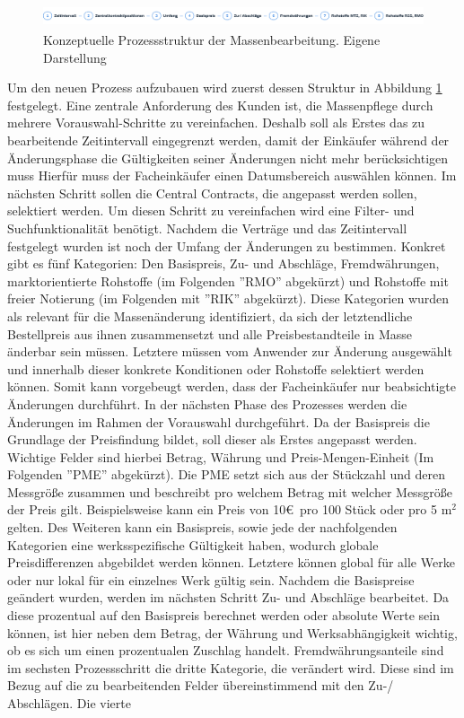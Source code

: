 \begin{figure}[H]
    \centering
    \includegraphics[height=0.7cm]{Bilder/Praxisteil-Konzept-Prozess.png}
    \caption[Konzeptuelle Prozessstruktur der Massenbearbeitung]{Konzeptuelle Prozessstruktur der Massenbearbeitung. Eigene Darstellung}
    \label{fig:PraxisKonzeptProzess}
\end{figure}

Um den neuen Prozess aufzubauen wird zuerst dessen Struktur in Abbildung \ref{fig:PraxisKonzeptProzess} festgelegt. Eine zentrale Anforderung des Kunden ist, die Massenpflege durch mehrere Vorauswahl-Schritte zu vereinfachen. Deshalb soll als Erstes das zu bearbeitende Zeitintervall eingegrenzt werden, damit der Einkäufer während der Änderungsphase die Gültigkeiten seiner Änderungen nicht mehr berücksichtigen muss Hierfür muss der Facheinkäufer einen Datumsbereich auswählen können. Im nächsten Schritt sollen die Central Contracts, die angepasst werden sollen, selektiert werden. Um diesen Schritt zu vereinfachen wird eine Filter- und Suchfunktionalität benötigt. Nachdem die Verträge und das Zeitintervall festgelegt wurden ist noch der Umfang der Änderungen zu bestimmen. Konkret gibt es fünf Kategorien: Den Basispreis, Zu- und Abschläge, Fremdwährungen, marktorientierte Rohstoffe (im Folgenden ''RMO'' abgekürzt) und Rohstoffe mit freier Notierung (im Folgenden mit ''RIK'' abgekürzt). Diese Kategorien wurden als relevant für die Massenänderung identifiziert, da sich der letztendliche Bestellpreis aus ihnen zusammensetzt und alle Preisbestandteile in Masse änderbar sein müssen. Letztere müssen vom Anwender zur Änderung ausgewählt und innerhalb dieser konkrete Konditionen oder Rohstoffe selektiert werden können. Somit kann vorgebeugt werden, dass der Facheinkäufer nur beabsichtigte Änderungen durchführt. In der nächsten Phase des Prozesses werden die Änderungen im Rahmen der Vorauswahl durchgeführt. Da der Basispreis die Grundlage der Preisfindung bildet, soll dieser als Erstes angepasst werden. Wichtige Felder sind hierbei Betrag, Währung und Preis-Mengen-Einheit (Im Folgenden ''PME'' abgekürzt). Die PME setzt sich aus der Stückzahl und deren Messgrö\ss e zusammen und beschreibt pro welchem Betrag mit welcher Messgrö\ss e der Preis gilt. Beispielsweise kann ein Preis von 10\euro\ pro 100 Stück oder pro 5 m$^2$ gelten. Des Weiteren kann ein Basispreis, sowie jede der nachfolgenden Kategorien eine werksspezifische Gültigkeit haben, wodurch globale Preisdifferenzen abgebildet werden können. Letztere können global für alle Werke oder nur lokal für ein einzelnes Werk gültig sein. Nachdem die Basispreise geändert wurden, werden im nächsten Schritt Zu- und Abschläge bearbeitet. Da diese prozentual auf den Basispreis berechnet werden oder absolute Werte sein können, ist hier neben dem Betrag, der Währung und Werksabhängigkeit wichtig, ob es sich um einen prozentualen Zuschlag handelt. Fremdwährungsanteile sind im sechsten Prozessschritt die dritte Kategorie, die verändert wird. Diese sind im Bezug auf die zu bearbeitenden Felder übereinstimmend mit den Zu-/ Abschlägen. Die vierte 